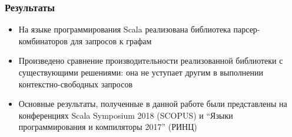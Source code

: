 \documentclass[xcolor=table]{beamer}
\begin{document}
\begin{frame}
  \transwipe[direction=90]
  \frametitle{Результаты}

  \begin{itemize}
      \item На языке программирования Scala реализована библиотека парсер-комбинаторов для запросов к графам
      \item Произведено сравнение производительности реализованной библиотеки с существующими решениями: она не уступает другим в выполнении контекстно-свободных запросов
      \item Основные результаты, полученные в данной работе были представлены на конференциях Scala Symposium 2018 (SCOPUS) и ``Языки программирования и компиляторы 2017'' (РИНЦ)
  \end{itemize}

\end{frame}
\end{document}
